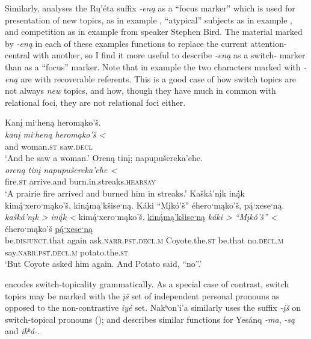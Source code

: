 \documentclass[output=paper]{LSP/langsci}
\begin{document}
	Similarly, \citet{Wolvengrey1991} analyses the Rų’éta suffix \emph{-eną} as a “focus marker” which is used for presentation of new topics, as in example , “atypical” subjects as in example , and  competition as in example  from speaker Stephen Bird. The material marked by \emph{-eną} in each of these examples functions to replace the current attention-central   with another, so I find it more useful to describe \emph{-eną} as a switch- marker than as a “focus” marker. Note that in example  the two characters marked with \emph{-eną} are  with recoverable referents. This is a good case of how switch topics are not always \emph{new} topics, and how, though they have much in common with relational foci, they are not relational foci either.

\ea\label{ruetaswitchtopic}
\ea\label{ruetanewtopic}
Kanį miˑheną heromąko’š.\footnotemark\\
\gll 	\emph{kanį}	 	\emph{miˑheną} 	\emph{heromąko’š <}\\
	and 			woman.\textsc{st} 	saw.\textsc{decl}\\
\glt	`And he saw a woman.'
\ex\label{ruetaatypicalsubject}
Oreną tinį; napupušereka’ehe.\footnotemark\\
\gll 	\emph{oreną}	\emph{tinį}	\emph{napupušereka’ehe <}\\
	fire.\textsc{st} 	arrive.and 	burn.in.streaks.\textsc{hearsay}\\
\glt	`A prairie fire arrived and burned him in streaks.'
\ex\label{birdcompetition}
Kašká’nįk in\'{ą}k kim\'{ą}ˑxeroˑmąko’š, kin\'{ą}mą’kšiseˑną. Káki “Mįkó’š” éheroˑmąko’š, p\'{ą}ˑxeseˑną.\footnotemark\\
\gll 	\emph{kašká’nįk >}		\emph{in\'{ą}k <} 	kim\'{ą}ˑxeroˑmąko’š, 		\underline{kin\'{ą}mą’kšiseˑną}	\emph{káki >}	\emph{“Mįkó’š” <}			éheroˑmąko’š 			\underline{p\'{ą}ˑxeseˑną}\\
	be.\textsc{disjunct}.that 	again 			ask.\textsc{narr.pst.decl.m} 	Coyote.the.\textsc{st}		be.that 		no.\textsc{decl.m} 					say.\textsc{narr.pst.decl.m} 	potato.the.\textsc{st}\\
\glt	`But Coyote asked him again. And Potato said, “no”.'
\z\z

	 encodes switch-topicality grammatically. As a special case of contrast, switch topics may be marked with the \emph{įš} set of independent personal pronouns as opposed to the non-contrastive \emph{iyé} set. Nakʰon’i’a similarly uses the suffix \emph{-įš} on switch-topical pronouns (\citealt[129--130]{Cumberland2005}); and \citet[149]{Oliverio1996} describes similar functions for Yesánq \emph{-ma}, \emph{-są} and \emph{ikʰá-}. 
	
\end{document}
